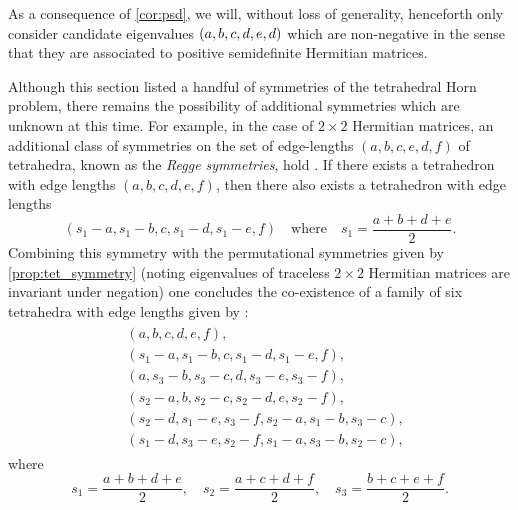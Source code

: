 \documentclass[notitlepage, 11pt, letterpaper]{amsart}
\begin{document}
As a consequence of \cref{cor:psd}, we will, without loss of generality, henceforth only consider candidate eigenvalues $(a,b,c,d,e,d)$ which are non-negative in the sense that they are associated to positive semidefinite Hermitian matrices.
\begin{rem}
    Although this section listed a handful of symmetries of the tetrahedral Horn problem, there remains the possibility of additional symmetries which are unknown at this time.
    For example, in the case of $2\times 2$ Hermitian matrices, an additional class of symmetries on the set of edge-lengths $(a,b,c,e,d,f)$ of tetrahedra, known as the \textit{Regge symmetries}, hold \cite{akopyan2019regge,boalch2007regge,ponzano1968semiclassical}.
    If there exists a tetrahedron with edge lengths $(a,b,c,d,e,f)$, then there also exists a tetrahedron with edge lengths
    \begin{equation}
        (s_1-a,s_1-b,c,s_1-d,s_1-e,f) \quad \text{where} \quad s_1 = \frac{a+b+d+e}{2}.
    \end{equation}
    Combining this symmetry with the permutational symmetries given by \cref{prop:tet_symmetry} (noting eigenvalues of traceless $2 \times 2$ Hermitian matrices are invariant under negation) one concludes the co-existence of a family of six tetrahedra with edge lengths given by \cite[Chapter 9]{varshalovich1988quantum}:
    \begin{align}
        \begin{split}
            &(a,b,c,d,e,f), \\
            &(s_1-a,s_1-b,c,s_1-d,s_1-e,f), \\
            &(a,s_3-b,s_3-c,d,s_3-e,s_3-f), \\
            &(s_2-a,b,s_2-c,s_2-d,e,s_2-f), \\
            &(s_2-d,s_1-e,s_3-f,s_2-a,s_1-b,s_3-c), \\
            &(s_1-d,s_3-e,s_2-f,s_1-a,s_3-b,s_2-c),
        \end{split}
    \end{align}
    where
    \begin{equation}
        s_1 = \frac{a+b+d+e}{2}, \quad
        s_2 = \frac{a+c+d+f}{2}, \quad
        s_3 = \frac{b+c+e+f}{2}.
    \end{equation}
\end{rem}
\end{document}
